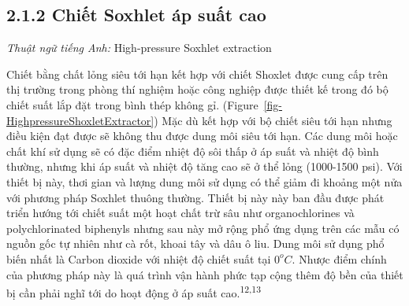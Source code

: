 \documentclass[
  twocolumn,
  landscape]{report}
\begin{document}
\subsection{2.1.2 Chiết Soxhlet áp suất
cao}\label{chiux1ebft-soxhlet-uxe1p-suux1ea5t-cao}

\emph{Thuật ngữ tiếng Anh:} High-pressure Soxhlet extraction

Chiết bằng chất lỏng siêu tới hạn kết hợp với chiết Shoxlet được cung
cấp trên thị trường trong phòng thí nghiệm hoặc công nghiệp được thiết
kế trong đó bộ chiết suất lắp đặt trong bình thép không gỉ.
(Figure~\ref{fig-HighpressureShoxletExtractor}) Mặc dù kết hợp với bộ
chiết siêu tới hạn nhưng điều kiện đạt được sẽ không thu được dung môi
siêu tới hạn. Các dung môi hoặc chất khí sử dụng sẽ có đặc điểm nhiệt độ
sôi thấp ở áp suất và nhiệt độ bình thường, nhưng khi áp suất và nhiệt
độ tăng cao sẽ ở thể lỏng (1000-1500 psi). Với thiết bị này, thơi gian
và lượng dung môi sử dụng có thể giảm đi khoảng một nửa với phương pháp
Soxhlet thuông thường. Thiết bị này này ban đầu được phát triển hướng
tới chiết suất một hoạt chất trừ sâu như organochlorines và
polychlorinated biphenyls nhưng sau này mở rộng phổ ứng dụng trên các
mẫu có nguồn gốc tự nhiên như cà rốt, khoai tây và dâu ô liu. Dung môi
sử dụng phổ biến nhất là Carbon dioxide với nhiệt độ chiết suất tại
\(0^oC\). Nhược điểm chính của phương pháp này là quá trình vận hành
phức tạp cộng thêm độ bền của thiết bị cần phải nghĩ tới do hoạt động ở
áp suất cao.\textsuperscript{12,13}
\end{document}
